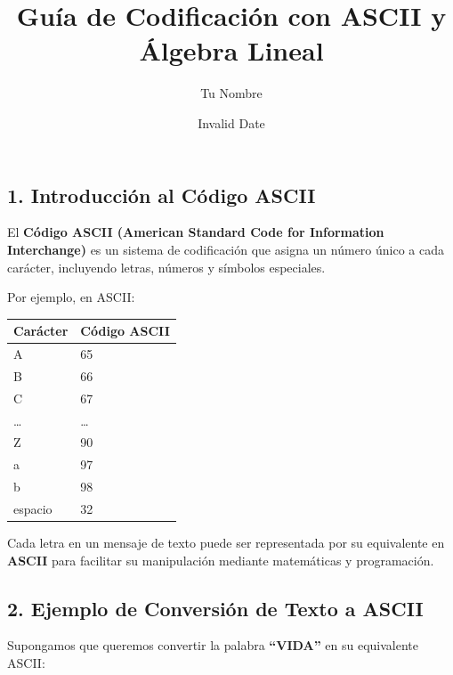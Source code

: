 \documentclass[
  letterpaper,
  DIV=11,
  numbers=noendperiod]{scrartcl}
\title{Guía de Codificación con ASCII y Álgebra Lineal}
\author{Tu Nombre}
\date{Invalid Date}
\begin{document}
\maketitle


\subsection{1. Introducción al Código
ASCII}\label{introducciuxf3n-al-cuxf3digo-ascii}

El \textbf{Código ASCII (American Standard Code for Information
Interchange)} es un sistema de codificación que asigna un número único a
cada carácter, incluyendo letras, números y símbolos especiales.

Por ejemplo, en ASCII:

\begin{longtable}[]{@{}ll@{}}
\toprule\noalign{}
Carácter & Código ASCII \\
\midrule\noalign{}
\endhead
\bottomrule\noalign{}
\endlastfoot
A & 65 \\
B & 66 \\
C & 67 \\
\ldots{} & \ldots{} \\
Z & 90 \\
a & 97 \\
b & 98 \\
espacio & 32 \\
\end{longtable}

Cada letra en un mensaje de texto puede ser representada por su
equivalente en \textbf{ASCII} para facilitar su manipulación mediante
matemáticas y programación.

\subsection{2. Ejemplo de Conversión de Texto a
ASCII}\label{ejemplo-de-conversiuxf3n-de-texto-a-ascii}

Supongamos que queremos convertir la palabra \textbf{``VIDA''} en su
equivalente ASCII:
\end{document}
